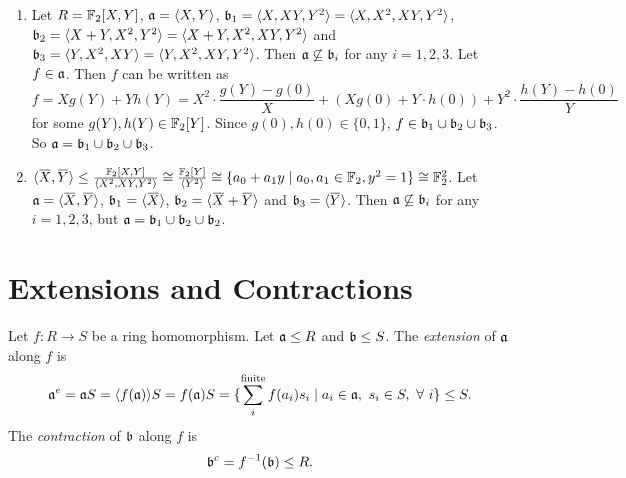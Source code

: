 \begin{example}
    \begin{enumerate}
        \item Let $R = \mathbb{F}_2[X,Y]$, $\mathfrak{a} = \langle X,Y \rangle$, $\mathfrak{b}_1 = \langle X,XY,Y^2 \rangle = \langle X,X^2,XY,Y^2 \rangle$, $\mathfrak{b}_2 = \langle X+Y,X^2,Y^2 \rangle = \langle X+Y,X^2,XY,Y^2 \rangle$ and $\mathfrak{b}_3 = \langle Y,X^2,XY \rangle = \langle Y,X^2,XY,Y^2 \rangle$. Then $\mathfrak{a} \not \subseteq \mathfrak{b}_i$ for any $i = 1,2,3$. Let $f \in \mathfrak{a}$. Then $f$ can be written as 
            \[f = X g(Y) + Y h(Y) = X^2 \cdot \frac{g(Y)-g(0)}{X} + (Xg(0)+Y \cdot h(0)) + Y^2 \cdot \frac{h(Y)-h(0)}{Y} \]
            for some $g(Y),h(Y) \in \mathbb{F}_2[Y]$. Since $g(0), h(0) \in \{0,1\}$, $f \in \mathfrak{b}_1 \cup \mathfrak{b}_2 \cup \mathfrak{b}_3$. So $\mathfrak{a} = \mathfrak{b}_1 \cup \mathfrak{b}_2 \cup \mathfrak{b}_3$.
        \item $ \langle \overbar X, \overbar Y \rangle \leq \frac{\bbF_2[X,Y]}{\langle X^2,XY,Y^2 \rangle} \cong \frac{\bbF_2[Y]}{\langle Y^2 \rangle} \cong \{a_0 + a_1y \mid a_0,a_1 \in \bbF_2, y^2 = 1\} \cong \bbF_2^2$. Let $\ffa = \langle \overbar X,\overbar Y \rangle$, $\ffb_1 = \langle \overbar X \rangle$, $\ffb_2 = \langle \overbar X + \overbar Y \rangle$ and $\ffb_3 = \langle \overbar Y \rangle$. Then $\mathfrak{a} \not \subseteq \mathfrak{b}_i$ for any $i = 1,2,3$, but $\mathfrak{a} = \mathfrak{b}_1 \cup \mathfrak{b}_2 \cup \mathfrak{b}_2$.
    \end{enumerate}
\end{example}

\section*{Extensions and Contractions}

\begin{definition}
    Let $f: R \to S$ be a ring homomorphism. Let $\mathfrak{a} \leq R$ and $\mathfrak{b} \leq S$. The \emph{extension} of $\mathfrak{a}$ along $f$ is 
    \[\mathfrak{a}^e = \mathfrak{a} S = \langle f(\mathfrak{a}) \rangle S  = f(\mathfrak{a})S = \{\sum_i^{\text{finite}} f(a_i)s_i \mid a_i \in \mathfrak{a},\ s_i \in S, \ \forall \  i\} \leq S.\]
    The \emph{contraction} of $\mathfrak{b}$ along $f$ is 
    \[\mathfrak{b}^c = f^{-1}(\mathfrak{b}) \leq R.\]
\end{definition}

